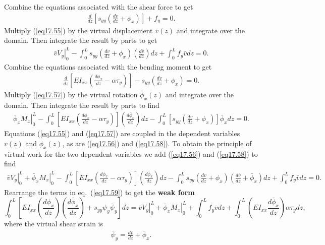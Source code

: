 \documentclass{AeroStructure-ERJohnson}
\begin{document}
Combine the equations associated with the shear force to get
\begin{align}\label{eq17.55}
\frac{d}{d z}\left[s_{y y}\left(\frac{d v}{d z}+\phi_{x}\right)\right]+f_{y}=0.
\end{align}
Multiply (\ref{eq17.55}) by the virtual displacement $\bar{v}(z)$ and integrate over the domain. Then integrate the result by parts to get
\begin{align}\label{eq17.56}
\left.\bar{v} V_{y}\right|_{0} ^{L}-\int_{0}^{L} s_{y y}\left(\frac{d v}{d z}+\phi_{x}\right)\left(\frac{d \bar{v}}{d z}\right) d z+\int_{0}^{L} f_{y} \bar{v} d z=0.
\end{align}
Combine the equations associated with the bending moment to get
\begin{align}\label{eq17.57}
\frac{d}{d z}\left[E I_{xx}\left(\frac{d \phi_{x}}{d z}-\alpha \tau_{y}\right)\right]-s_{y y}\left(\frac{d v}{d z}+\phi_{x}\right)=0.
\end{align}
Multiply (\ref{eq17.57}) by the virtual rotation $\bar{\phi}_{x}(z)$ and integrate over the domain. Then integrate the result by parts to find
\begin{align}\label{eq17.58}
\left.\bar{\phi}_{x} M_{x}\right|_{0} ^{L}-\int_{0}^{L}\left[E I_{x x}\left(\frac{d \phi_{x}}{d z}-\alpha \tau_{y}\right)\right]\left(\frac{d \bar{\phi}_{x}}{d z}\right) d z-\int_{0}^{L}\left[s_{y y}\left(\frac{d v}{d z}+\phi_{x}\right)\right] \bar{\phi}_{x} d z=0.
\end{align}
Equations (\ref{eq17.55}) and (\ref{eq17.57}) are coupled in the dependent variables $v(z)$ and $\phi_{x}(z)$, as are (\ref{eq17.56}) and (\ref{eq17.58}). To obtain the principle of virtual work for the two dependent variables we add (\ref{eq17.56}) and (\ref{eq17.58}) to find
\begin{align}\label{eq17.59}
\left.\bar{v} V_{y}\right|_{0} ^{L}+\left.\bar{\phi}_{x} M_{x}\right|_{0} ^{L}-\int_{0}^{L}\left[E I_{x x}\left(\frac{d \phi_{x}}{d z}-\alpha \tau_{y}\right)\right]\left(\frac{d \bar{\phi}_{x}}{d z}\right) d z-\int_{0}^{L} s_{y y}\left(\frac{d v}{d z}+\phi_{x}\right)\left(\frac{d \bar{v}}{d z}+\bar{\phi}_{x}\right) d z+\int_{0}^{L} f_{y} \bar{v} d z=0.
\end{align}
Rearrange the terms in eq.~(\ref{eq17.59}) to get the \textbf{weak form}
\begin{equation}
\int_{0}^{L}\left[E I_{x x}\left(\frac{d \phi_{x}}{d z}\right)\left(\frac{d \bar{\phi}_{x}}{d z}\right)+s_{y y} \psi_{y} \bar{\psi}_{y}\right] d z=\left.\bar{v} V_{y}\right|_{0} ^{L}+\left.\bar{\phi}_{x} M_{x}\right|_{0} ^{L}+\int_{0}^{L} f_{y} \bar{v} d z+\int_{0}^{L}\left(E I_{x x} \frac{d \bar{\phi}_{x}}{d z}\right) \alpha \tau_{y} d z, \label{eq17.60}
\end{equation}
where the virtual shear strain is
\begin{align}\label{eq17.61}
\bar{\psi}_{y}=\frac{d \bar{v}}{d z}+\bar{\phi}_{x}.
\end{align}
\end{document}

